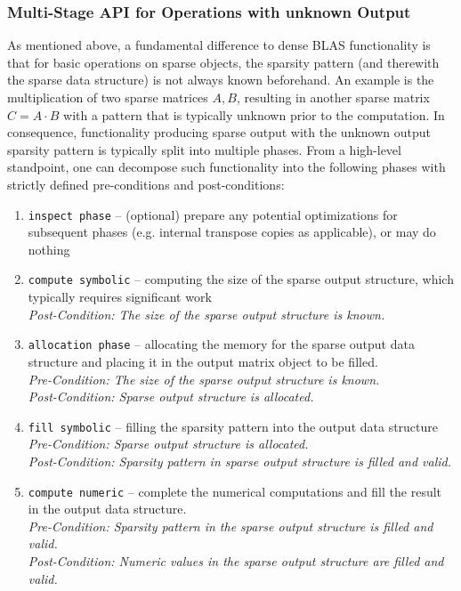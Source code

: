 \documentclass[manuscript,review]{acmart}
\begin{document}
\subsubsection{Multi-Stage API for Operations with unknown Output}


As mentioned above, a fundamental difference to dense BLAS functionality is that for basic operations on sparse objects, the sparsity pattern (and therewith the sparse data structure) is not always known beforehand. An example is the multiplication of two sparse matrices $A, B$, resulting in another sparse matrix $C = A\cdot B$ with a pattern that is typically unknown prior to the computation. In consequence, functionality producing sparse output with the unknown output sparsity pattern is typically split into multiple phases. From a high-level standpoint, one can decompose such functionality into the following phases with strictly defined pre-conditions and post-conditions:

\begin{enumerate}
    \item \texttt{inspect phase} -- (optional) prepare any potential optimizations for subsequent phases (e.g.  internal transpose copies as applicable), or may do nothing
    \item \texttt{compute symbolic} -- computing the size of the sparse output structure, which typically requires significant work\\
    \textit{Post-Condition: The size of the sparse output structure is known.}
    \item \texttt{allocation phase} -- allocating the memory for the sparse output data structure and placing it in the output matrix object to be filled.
    \\
    \textit{Pre-Condition: The size of the sparse output structure is known.}\\
    \textit{Post-Condition: Sparse output structure is allocated.}
    \item \texttt{fill symbolic} -- filling the sparsity pattern into the output data structure
    \textit{Pre-Condition: Sparse output structure is allocated.}\\
    \textit{Post-Condition: Sparsity pattern in sparse output structure is filled and valid.}
    \item \texttt{compute numeric} -- complete the numerical computations and fill the result in the output data structure.\\
    \textit{Pre-Condition: Sparsity pattern in the sparse output structure is filled and valid.\\
    Post-Condition: Numeric values in the sparse output structure are filled and valid.}
\end{enumerate}
\end{document}
